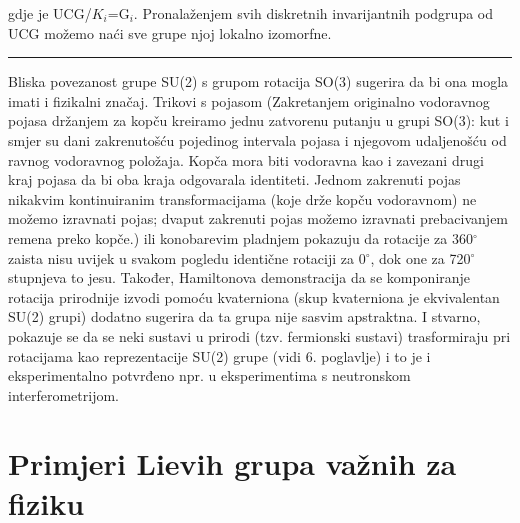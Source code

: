 gdje je UCG/$K_i$=G$_i$. Pronalaženjem svih diskretnih invarijantnih
podgrupa od UCG možemo naći sve grupe njoj lokalno izomorfne.

\rule{3cm}{0.5pt}

Bliska povezanost grupe SU(2) s grupom rotacija SO(3) sugerira da
bi ona mogla imati i fizikalni značaj. Trikovi s pojasom (Zakretanjem
originalno vodoravnog pojasa držanjem za kopču kreiramo jednu zatvorenu putanju
u grupi SO(3): kut i smjer su dani zakrenutošću pojedinog intervala
pojasa i njegovom udaljenošću od ravnog vodoravnog položaja. 
Kopča mora biti vodoravna kao i zavezani drugi kraj pojasa da bi
oba kraja odgovarala identiteti. Jednom zakrenuti pojas nikakvim kontinuiranim
transformacijama (koje drže kopču vodoravnom) ne možemo izravnati pojas; dvaput
zakrenuti pojas možemo izravnati prebacivanjem remena preko kopče.)
 ili konobarevim
pladnjem pokazuju da rotacije za 360$^\circ$ zaista nisu uvijek u svakom pogledu
identične rotaciji za 0$^\circ$, dok one za 720$^\circ$ stupnjeva to jesu.
Također, Hamiltonova demonstracija da se komponiranje rotacija prirodnije
izvodi pomoću kvaterniona (skup kvaterniona je ekvivalentan SU(2) grupi) 
dodatno sugerira da ta grupa nije sasvim apstraktna.
  I stvarno, pokazuje se da se neki sustavi u prirodi (tzv. fermionski
sustavi) trasformiraju pri rotacijama kao reprezentacije SU(2) grupe
(vidi 6. poglavlje)
i to je i eksperimentalno potvrđeno npr. u eksperimentima s neutronskom
interferometrijom. 

\section{Primjeri Lievih grupa važnih za fiziku}
\label{sec:primjeriLie}

